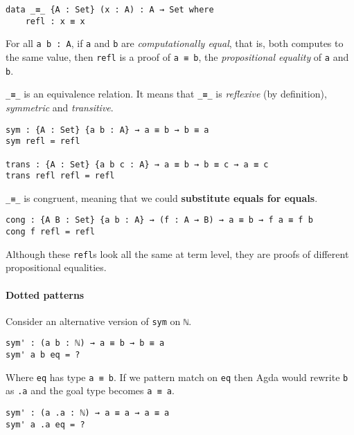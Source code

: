 \documentclass[../thesis.tex]{subfiles}
\begin{document}
\begin{lstlisting}
data _≡_ {A : Set} (x : A) : A → Set where
    refl : x ≡ x
\end{lstlisting}

For all {\lstinline|a b : A|}, if {\lstinline|a|} and {\lstinline|b|} are
\textit{computationally equal}, that is, both computes to the same value,
then {\lstinline|refl|} is a proof of {\lstinline|a ≡ b|},
the \textit{propositional equality} of {\lstinline|a|} and {\lstinline|b|}.


{\lstinline|_≡_|} is an equivalence relation. It means that {\lstinline|_≡_|}
is \textit{reflexive} (by definition), \textit{symmetric} and \textit{transitive}.

\begin{lstlisting}
sym : {A : Set} {a b : A} → a ≡ b → b ≡ a
sym refl = refl

trans : {A : Set} {a b c : A} → a ≡ b → b ≡ c → a ≡ c
trans refl refl = refl
\end{lstlisting}

{\lstinline|_≡_|} is congruent, meaning that we could \textbf{substitute equals for equals}.

\begin{lstlisting}
cong : {A B : Set} {a b : A} → (f : A → B) → a ≡ b → f a ≡ f b
cong f refl = refl
\end{lstlisting}

Although these {\lstinline|refl|}s look all the same at term level,
they are proofs of different propositional equalities.

\paragraph{Dotted patterns}

Consider an alternative version of {\lstinline|sym|} on {\lstinline|ℕ|}.

\begin{lstlisting}
sym' : (a b : ℕ) → a ≡ b → b ≡ a
sym' a b eq = ?
\end{lstlisting}

Where {\lstinline|eq|} has type {\lstinline|a ≡ b|}.
If we pattern match on {\lstinline|eq|} then Agda would rewrite {\lstinline|b|}
as {\lstinline|.a|} and the goal type becomes {\lstinline|a ≡ a|}.
\begin{lstlisting}
sym' : (a .a : ℕ) → a ≡ a → a ≡ a
sym' a .a eq = ?
\end{lstlisting}
\end{document}
